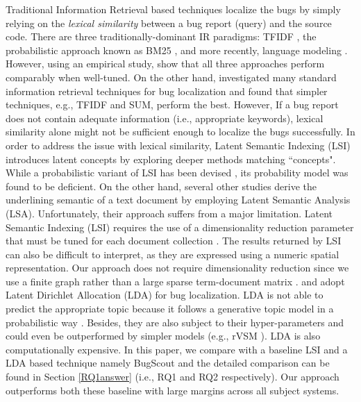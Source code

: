 \documentclass[sigconf,review,anonymous]{acmart}
\begin{document}
Traditional Information Retrieval based techniques localize the bugs by simply relying on the \emph{lexical similarity} between a bug report (query) and the source code. 
There are three traditionally-dominant IR paradigms: TFIDF \cite{Salton}, the probabilistic approach known as BM25 \cite{Robertson}, and more recently, language modeling \cite{Ponte}. However, using an empirical study, \citet{Fang} show that all three approaches perform comparably when well-tuned. On the other hand, \citet{Rao} investigated many standard information retrieval techniques for bug localization and found that simpler techniques, e.g., TFIDF and SUM, perform the best. However, If a bug report does not contain adequate information (i.e., appropriate keywords), lexical similarity alone might not be sufficient enough to localize the bugs successfully. In order to address the issue with lexical similarity, 
Latent Semantic Indexing (LSI) introduces latent concepts by exploring deeper methods matching ``concepts". While a probabilistic variant of LSI has been devised \cite{Hofmann}, its probability model was found to be deficient. On the other hand, several other studies \cite{Maletic, MarcusMaletic,irmarcus} derive the underlining semantic of a text document by employing Latent Semantic Analysis (LSA).
Unfortunately, their approach suffers from a major limitation.
Latent Semantic Indexing (LSI) requires the use of a dimensionality reduction parameter that must be tuned for each document collection \cite{Kontostathis}.
The results returned by LSI can also be difficult to interpret, as
they are expressed using a numeric spatial representation.
Our approach does not require dimensionality reduction since we use a finite graph rather than a large sparse term-document matrix \cite{MarcusLSI,MarcusMaletic}.
\citet{LukinsBL} and \cite{Nguyen} adopt Latent Dirichlet Allocation (LDA) for bug localization. LDA is not able to predict the appropriate topic because it follows a generative topic model in a probabilistic way \cite{Lukins}. Besides, they are also subject to their hyper-parameters and could even be outperformed by simpler models (e.g., rVSM \cite{Jian}).  
LDA is also computationally expensive. In this paper, we compare with a baseline LSI \cite{MarcusLSI} and a LDA based technique namely BugScout \cite{Nguyen} and the detailed comparison can be found in Section \ref{RQ1answer} (i.e., RQ1 and RQ2 respectively). Our approach outperforms both these baseline\cite{MarcusLSI,Nguyen} with large margins across all subject systems. 
\end{document}
